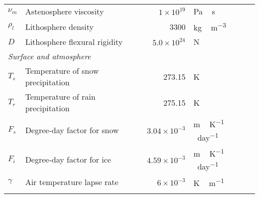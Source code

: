\documentclass[tc, manuscript]{copernicus}
\begin{document}
\begin{table*}
{\begin{tabular}{llrl}
    $\nu_m$ & Astenosphere viscosity
            & $1\times10^{19}$
            & \unit{Pa\,s} \\

    $\rho_l$& Lithosphere density
            & 3300
            & \unit{kg\,m^{-3}} \\

    $D$     & Lithosphere flexural rigidity
            & $5.0\times10^{24}$
            & \unit{N} \\

    \multicolumn{2}{l}{\emph{Surface and atmosphere}} \\

    $T_s$   & Temperature of snow precipitation
            & 273.15
            & \unit{K} \\

    $T_r$   & Temperature of rain precipitation
            & 275.15
            & \unit{K} \\

    $F_s$   & Degree-day factor for snow
            & $3.04\times10^{-3}$
            & \unit{m\,K^{-1}\,day^{-1}} \\

    $F_i$   & Degree-day factor for ice
            & $4.59\times10^{-3}$
            & \unit{m\,K^{-1}\,day^{-1}} \\

    $\gamma$& Air temperature lapse rate
            & $6\times10^{-3}$
            & \unit{K\,m^{-1}} \\

    \bottomhline
  \end{tabular}}
  \belowtable{}
\end{table*}
\end{document}
